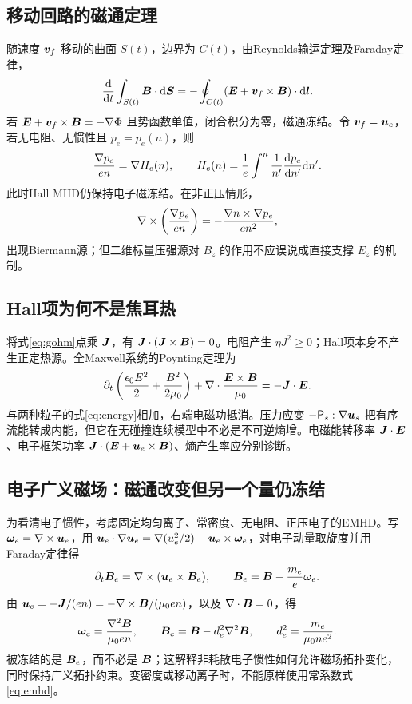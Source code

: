 \subsection{移动回路的磁通定理}
随速度 $\bm{v}_f$ 移动的曲面 $S(t)$，边界为 $C(t)$，由Reynolds输运定理及Faraday定律，
\begin{equation}{\mathrm d\over\mathrm dt}\int_{S(t)}\bm{B}\cdot\mathrm d\bm{S}=-\oint_{C(t)}(\bm{E}+\bm{v}_f\times\bm{B})\cdot\mathrm d\bm{l}.\label{eq:flux}\end{equation}
若 $\bm{E}+\bm{v}_f\times\bm{B}=-\nabla\Phi$ 且势函数单值，闭合积分为零，磁通冻结。令 $\bm{v}_f=\bm{u}_e$，若无电阻、无惯性且 $p_e=p_e(n)$，则
\begin{equation}{\nabla p_e\over en}=\nabla H_e(n),\qquad H_e(n)={1\over e}\int^n{1\over n'}{\mathrm d p_e\over\mathrm d n'}\mathrm d n'.
\end{equation}
此时Hall MHD仍保持电子磁冻结。在非正压情形，
\begin{equation}\nabla\times\left({\nabla p_e\over en}\right)=-{\nabla n\times\nabla p_e\over en^2},
\end{equation}
出现Biermann源；但二维标量压强源对 $B_z$ 的作用不应误说成直接支撑 $E_z$ 的机制。

\subsection{Hall项为何不是焦耳热}
将式\eqref{eq:gohm}点乘 $\bm{J}$，有 $\bm{J}\cdot(\bm{J}\times\bm{B})=0$。电阻产生 $\eta J^2\ge0$；Hall项本身不产生正定热源。全Maxwell系统的Poynting定理为
\begin{equation}\partial_t\left({\epsilon_0E^2\over2}+{B^2\over2\mu_0}\right)+\nabla\cdot{\bm{E}\times\bm{B}\over\mu_0}=-\bm{J}\cdot\bm{E}.
\end{equation}
与两种粒子的式\eqref{eq:energy}相加，右端电磁功抵消。压力应变 $-\mathsf P_s:\nabla\bm{u}_s$ 把有序流能转成内能，但它在无碰撞连续模型中不必是不可逆熵增。电磁能转移率 $\bm{J}\cdot\bm{E}$、电子框架功率 $\bm{J}\cdot(\bm{E}+\bm{u}_e\times\bm{B})$、熵产生率应分别诊断。

\subsection{电子广义磁场：磁通改变但另一个量仍冻结}
为看清电子惯性，考虑固定均匀离子、常密度、无电阻、正压电子的EMHD。写 $\bm{\omega}_e=\nabla\times\bm{u}_e$，用
$\bm{u}_e\cdot\nabla\bm{u}_e=\nabla(u_e^2/2)-\bm{u}_e\times\bm{\omega}_e$，对电子动量取旋度并用Faraday定律得
\begin{equation}\partial_t\bm{B}_e=\nabla\times(\bm{u}_e\times\bm{B}_e),\qquad
\bm{B}_e=\bm{B}-{m_e\over e}\bm{\omega}_e.\label{eq:be}
\end{equation}
由 $\bm{u}_e=-\bm{J}/(en)=-\nabla\times\bm{B}/(\mu_0en)$，以及 $\nabla\cdot\bm{B}=0$，得
\begin{equation}\bm{\omega}_e={\nabla^2\bm{B}\over\mu_0en},\qquad
\bm{B}_e=\bm{B}-d_e^2\nabla^2\bm{B},\qquad d_e^2={m_e\over\mu_0ne^2}.\label{eq:emhd}
\end{equation}
被冻结的是 $\bm{B}_e$，而不必是 $\bm{B}$；这解释非耗散电子惯性如何允许磁场拓扑变化，同时保持广义拓扑约束。变密度或移动离子时，不能原样使用常系数式\eqref{eq:emhd}。

